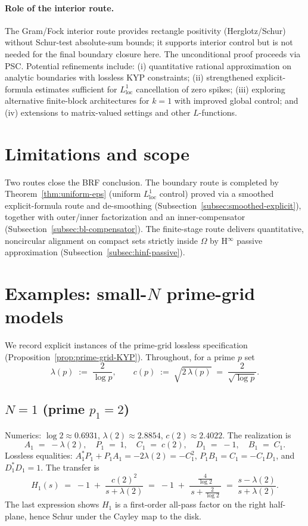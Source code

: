 \documentclass[11pt]{article}
\theoremstyle{definition}
\theoremstyle{remark}
\begin{document}
\paragraph{Role of the interior route.}
The Gram/Fock interior route provides rectangle positivity (Herglotz/Schur) without Schur-test absolute-sum bounds; it supports interior control but is not needed for the final boundary closure here. The unconditional proof proceeds via PSC.
Potential refinements include: (i) quantitative rational approximation on analytic boundaries with lossless KYP constraints; (ii) strengthened explicit-formula estimates sufficient for $L^1_{\mathrm{loc}}$ cancellation of zero spikes; (iii) exploring alternative finite-block architectures for $k=1$ with improved global control; and (iv) extensions to matrix-valued settings and other $L$-functions.

\section{Limitations and scope}\label{sec:limitations}
Two routes close the BRF conclusion. The boundary route is completed by Theorem~\ref{thm:uniform-eps} (uniform $L^1_{\mathrm{loc}}$ control) proved via a smoothed explicit-formula route and de-smoothing (Subsection~\ref{subsec:smoothed-explicit}), together with outer/inner factorization and an inner-compensator (Subsection~\ref{subsec:bl-compensator}). The finite-stage route delivers quantitative, noncircular alignment on compact sets strictly inside \(\Omega\) by H$^\infty$ passive approximation (Subsection~\ref{subsec:hinf-passive}).

\section{Examples: small-$N$ prime-grid models}\label{sec:examples}
We record explicit instances of the prime-grid lossless specification (Proposition~\ref{prop:prime-grid-KYP}). Throughout, for a prime \(p\) set
\[
 \lambda(p)\;:=\;\frac{2}{\log p},\qquad c(p)\;:=\;\sqrt{2\,\lambda(p)}\;=\;\frac{2}{\sqrt{\log p}}.
\]

\subsection*{$N=1$ (prime $p_1=2$)}
Numerics: \(\log 2\approx 0.6931\), \(\lambda(2)\approx 2.8854\), \(c(2)\approx 2.4022\). The realization is
\[
 A_1\;=\;-\lambda(2),\quad P_1\;=\;1,\quad C_1\;=\;c(2),\quad D_1\;=\;-1,\quad B_1\;=\;C_1.
\]
Lossless equalities: \(A_1^*P_1+P_1A_1=-2\lambda(2)=-C_1^2\), \(P_1B_1=C_1=-C_1 D_1\), and \(D_1^*D_1=1\). The transfer is
\[
 H_1(s)\;=\;-1\; +\; \frac{c(2)^2}{s+\lambda(2)}\;=\;-1\; +\;\frac{\tfrac{4}{\log 2}}{\,s+\tfrac{2}{\log 2}\,}\;=\;\frac{s-\lambda(2)}{s+\lambda(2)}.
\]
The last expression shows \(H_1\) is a first-order all-pass factor on the right half-plane, hence Schur under the Cayley map to the disk.
\end{document}
